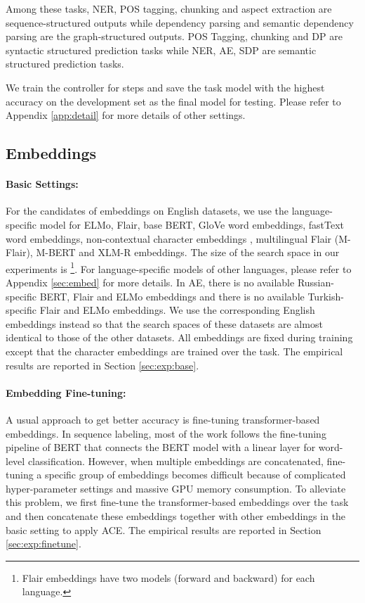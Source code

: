 \documentclass[11pt,a4paper]{article}
\begin{document}
Among these tasks, NER, POS tagging, chunking and aspect extraction are sequence-structured outputs while dependency parsing and semantic dependency parsing are the graph-structured outputs. POS Tagging, chunking and DP are syntactic structured prediction tasks while NER, AE, SDP are semantic structured prediction tasks. 


We train the controller for  steps and save the task model with the highest accuracy on the development set as the final model for testing. Please refer to Appendix \ref{app:detail} for more details of other settings.

\subsection{Embeddings}
\paragraph{Basic Settings:} For the candidates of embeddings on English datasets, we use the language-specific model for ELMo, Flair, base BERT, GloVe word embeddings, fastText word embeddings, non-contextual character embeddings \citep{lample-etal-2016-neural}, multilingual Flair (M-Flair), M-BERT and XLM-R embeddings. The size of the search space in our experiments is \footnote{Flair embeddings have two models (forward and backward) for each language.}. For language-specific models of other languages, please refer to Appendix \ref{sec:embed} for more details. In AE, there is no available Russian-specific BERT, Flair and ELMo embeddings and there is no available Turkish-specific Flair and ELMo embeddings. We use the corresponding English embeddings instead so that the search spaces of these datasets are almost identical to those of the other datasets. All embeddings are fixed during training except that the character embeddings are trained over the task. The empirical results are reported in Section \ref{sec:exp:base}.

\paragraph{Embedding Fine-tuning:} A usual approach to get better accuracy is fine-tuning transformer-based embeddings. In sequence labeling, most of the work follows the fine-tuning pipeline of BERT that connects the BERT model with a linear layer for word-level classification. 
However, when multiple embeddings are concatenated, fine-tuning a specific group of embeddings becomes difficult because of complicated hyper-parameter settings and massive GPU memory consumption. 
To alleviate this problem, we first fine-tune the transformer-based embeddings over the task and then concatenate these embeddings together with other embeddings in the basic setting to apply ACE. The empirical results are reported in Section \ref{sec:exp:finetune}.
\end{document}

